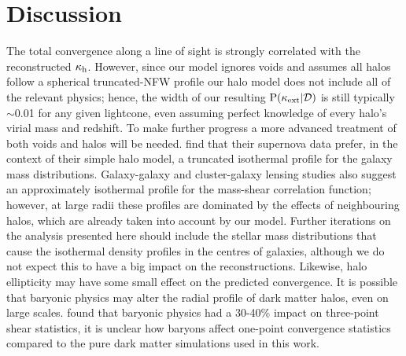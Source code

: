 \documentclass[useAMS,usenatbib,a4paper]{mn2e}
\begin{document}

\section{Discussion}
\label{sec:discuss}


The total convergence along a line of sight is strongly correlated with the
reconstructed $\kappa_{\rm h}$. However, since our model ignores voids and assumes
all halos follow a spherical truncated-NFW profile our halo model does not
include all of the relevant physics; hence, the width of our resulting
${\rm P}(\kappa_{\rm ext}|{\mathcal{D}})$ is still typically $\sim$0.01 for any given lightcone,
even assuming perfect knowledge of every halo's virial mass and redshift. To
make further progress a more advanced treatment of both voids and halos will
be needed. \citet{KarpenkaEtal2012} find that their supernova data prefer, in
the context of their simple halo model, a truncated isothermal profile for the
galaxy mass distributions. Galaxy-galaxy and cluster-galaxy  lensing studies
\citep[\eg][]{GavazziEtal2007,JohnstonEtal2007, LagattutaEtal2010} also suggest an approximately
isothermal profile for the mass-shear correlation function; however, at large
radii these profiles are dominated by the effects of neighbouring halos, which
are already taken into account by our model.  Further iterations on the
analysis presented here should include the stellar mass distributions that
cause the isothermal density profiles in the centres of galaxies, although we
do not expect this to have a big impact on the reconstructions. Likewise, 
halo ellipticity
may have some small effect on the predicted convergence. It
is possible that baryonic physics may alter the radial profile of dark
matter halos, even on large scales. \citet{Semboloni+2012} found that baryonic
physics had a 30-40\% impact on three-point shear statistics, it is unclear
how baryons affect one-point convergence statistics compared to the pure dark
matter simulations used in this work.
\end{document}
